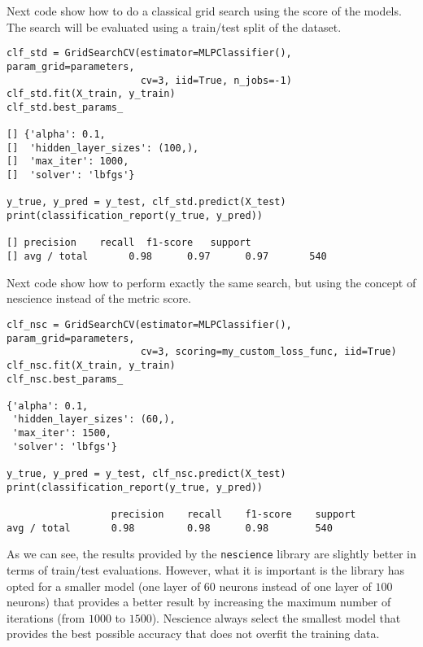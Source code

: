 \begin{example}
Next code show how to do a classical grid search using the score of the models. The search will be evaluated using a train/test split of the dataset.
 
\begin{sourcecode}
{\scriptsize \begin{verbatim}
clf_std = GridSearchCV(estimator=MLPClassifier(), param_grid=parameters,
                       cv=3, iid=True, n_jobs=-1)
clf_std.fit(X_train, y_train)
clf_std.best_params_

[] {'alpha': 0.1,
[]  'hidden_layer_sizes': (100,),
[]  'max_iter': 1000,
[]  'solver': 'lbfgs'}

y_true, y_pred = y_test, clf_std.predict(X_test)
print(classification_report(y_true, y_pred))

[] precision    recall  f1-score   support
[] avg / total       0.98      0.97      0.97       540
\end{verbatim}}
\end{sourcecode}

Next code show how to perform exactly the same search, but using the concept of nescience instead of the metric score.

\begin{sourcecode}
{\scriptsize \begin{verbatim}
clf_nsc = GridSearchCV(estimator=MLPClassifier(), param_grid=parameters,
                       cv=3, scoring=my_custom_loss_func, iid=True)
clf_nsc.fit(X_train, y_train)
clf_nsc.best_params_

{'alpha': 0.1,
 'hidden_layer_sizes': (60,),
 'max_iter': 1500,
 'solver': 'lbfgs'}

y_true, y_pred = y_test, clf_nsc.predict(X_test)
print(classification_report(y_true, y_pred))

                  precision    recall    f1-score    support
avg / total       0.98         0.98      0.98        540
\end{verbatim}}
\end{sourcecode}

As we can see, the results provided by the \texttt{nescience} library are slightly better in terms of train/test evaluations. However, what it is important is the library has opted for a smaller model (one layer of $60$ neurons instead of one layer of $100$ neurons) that provides a better result by increasing the maximum number of iterations (from $1000$ to $1500$). Nescience always select the smallest model that provides the best possible accuracy that does not overfit the training data.

\end{example}

